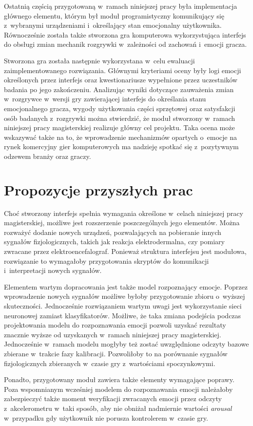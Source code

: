 Ostatnią częścią przygotowaną w~ramach niniejszej pracy była implementacja głównego elementu, którym był moduł programistyczny komunikujący się z~wybranymi urządzeniami i~określający stan emocjonalny użytkownika. Równocześnie została także stworzona gra komputerowa wykorzystująca interfejs do obsługi zmian mechanik rozgrywki w~zależności od zachowań i~emocji gracza. 

Stworzona gra została następnie wykorzystana w~celu ewaluacji zaimplementowanego rozwiązania. Głównymi kryteriami oceny były logi emocji określonych przez interfejs oraz kwestionariusze wypełnione przez uczestników badania po jego zakończeniu. Analizując wyniki dotyczące zauważenia zmian w~rozgrywce w~wersji gry zawierającej interfejs do określania stanu emocjonalnego gracza, wygody użytkowania części sprzętowej oraz satysfakcji osób badanych z~rozgrywki można stwierdzić, że moduł stworzony w~ramach niniejszej pracy magisterskiej realizuje główny cel projektu. Taka ocena może wskazywać także na to, że wprowadzenie mechanizmów opartych o~emocje na rynek komercyjny gier komputerowych ma nadzieję spotkać się z~pozytywnym odzewem branży oraz graczy.

\section{Propozycje przyszłych prac}
Choć stworzony interfejs spełnia wymagania określone w~celach niniejszej pracy magisterskiej, możliwe jest rozszerzenie poszczególnych jego elementów. Można rozważyć dodanie nowych urządzeń, pozwalających na pobieranie innych sygnałów fizjologicznych, takich jak reakcja elektrodermalna, czy pomiary zwracane przez elektroencefalograf. Ponieważ struktura interfejsu jest modułowa, rozwiązanie to wymagałoby przygotowania skryptów do komunikacji i~interpretacji nowych sygnałów. 

Elementem wartym dopracowania jest także model rozpoznający emocje. Poprzez wprowadzenie nowych sygnałów możliwe byłoby przygotowanie zbioru o~wyższej skuteczności. Jednocześnie rozwiązaniem wartym uwagi jest wykorzystanie sieci neuronowej zamiast klasyfikatorów. Możliwe, że taka zmiana podejścia podczas projektowania modelu do rozpoznawania emocji pozwoli uzyskać rezultaty znacznie wyższe od uzyskanych w~ramach niniejszej pracy magisterskiej. Jednocześnie w~ramach modelu mogłyby też zostać uwzględnione odczyty bazowe zbierane w~trakcie fazy kalibracji. Pozwoliłoby to na porównanie sygnałów fizjologicznych zbieranych w~czasie gry z~wartościami spoczynkowymi. 

Ponadto, przygotowany moduł zawiera także elementy wymagające poprawy. Poza wspomnianym wcześniej modelem do rozpoznawania emocji należałoby zabezpieczyć także moment weryfikacji zwracanych emocji przez odczyty z~akcelerometru w~taki sposób, aby nie obniżał nadmiernie wartości \textit{arousal} w~przypadku gdy użytkownik nie porusza kontrolerem w~czasie gry.


